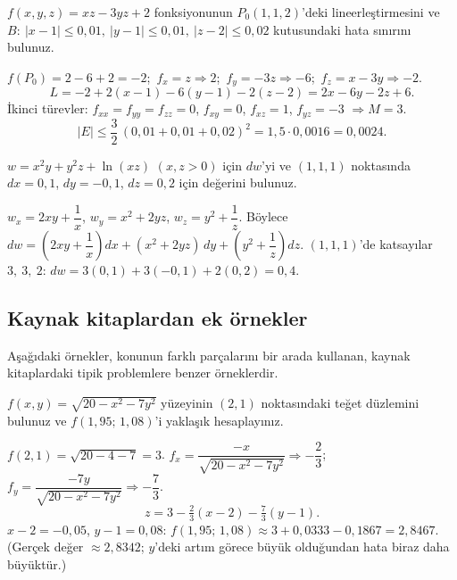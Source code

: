 \begin{soru}
$f(x,y,z)=xz-3yz+2$ fonksiyonunun $P_0(1,1,2)$'deki lineerleştirmesini ve
$B:\ |x-1|\le0{,}01,\ |y-1|\le0{,}01,\ |z-2|\le0{,}02$ kutusundaki hata sınırını bulunuz.
\end{soru}
\begin{cevap}
$f(P_0)=2-6+2=-2$;\ $f_x=z\Rightarrow2$;\ $f_y=-3z\Rightarrow-6$;\ $f_z=x-3y\Rightarrow-2$.
\[ L=-2+2(x-1)-6(y-1)-2(z-2)=2x-6y-2z+6 . \]
İkinci türevler: $f_{xx}=f_{yy}=f_{zz}=0$, $f_{xy}=0$, $f_{xz}=1$, $f_{yz}=-3$ $\Rightarrow M=3$.
\[ |E|\le\frac32\,(0{,}01+0{,}01+0{,}02)^2=1{,}5\cdot0{,}0016=0{,}0024 . \]
\end{cevap}

\begin{soru}
$w=x^2y+y^2z+\ln(xz)$ $(x,z>0)$ için $dw$'yi ve $(1,1,1)$ noktasında $dx=0{,}1$, $dy=-0{,}1$, $dz=0{,}2$ için değerini bulunuz.
\end{soru}
\begin{cevap}
$w_x=2xy+\dfrac1x$, $w_y=x^2+2yz$, $w_z=y^2+\dfrac1z$. Böylece
$dw=\left(2xy+\dfrac1x\right)dx+(x^2+2yz)\,dy+\left(y^2+\dfrac1z\right)dz$.
$(1,1,1)$'de katsayılar $3,\ 3,\ 2$: $dw=3(0{,}1)+3(-0{,}1)+2(0{,}2)=0{,}4$.
\end{cevap}

\subsection{Kaynak kitaplardan ek örnekler}

Aşağıdaki örnekler, konunun farklı parçalarını bir arada kullanan, kaynak kitaplardaki tipik problemlere benzer
örneklerdir.

\begin{soru}
$f(x,y)=\sqrt{20-x^2-7y^2}$ yüzeyinin $(2,1)$ noktasındaki teğet düzlemini bulunuz ve $f(1{,}95;\,1{,}08)$'i yaklaşık hesaplayınız.
\end{soru}
\begin{cevap}
$f(2,1)=\sqrt{20-4-7}=3$. $f_x=\dfrac{-x}{\sqrt{20-x^2-7y^2}}\Rightarrow-\dfrac23$;\
$f_y=\dfrac{-7y}{\sqrt{20-x^2-7y^2}}\Rightarrow-\dfrac73$.
\[ z=3-\tfrac23(x-2)-\tfrac73(y-1) . \]
$x-2=-0{,}05$, $y-1=0{,}08$: $f(1{,}95;\,1{,}08)\approx3+0{,}0333-0{,}1867=2{,}8467$. (Gerçek değer $\approx2{,}8342$;
$y$'deki artım görece büyük olduğundan hata biraz daha büyüktür.)
\end{cevap}

